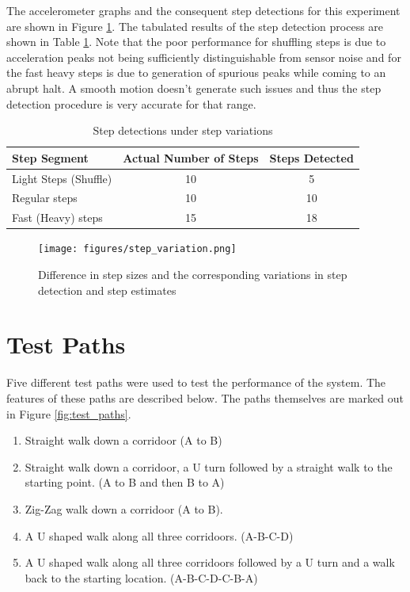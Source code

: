 The accelerometer graphs and the consequent step detections for this 
experiment are shown in Figure \ref{fig:step_variation}. The tabulated
results of the step detection process are shown in 
Table \ref{tbl:step_variation}. Note that the poor performance for 
shuffling steps is due to acceleration peaks not being sufficiently 
distinguishable from sensor noise and for the fast heavy steps is 
due to generation of spurious peaks while coming to an abrupt halt.
A smooth motion doesn't generate such issues and thus the step 
detection procedure is very accurate for that range.

\begin{table}[tbph]
    \centering
    \begin{tabular}{|l|c|c|}
        \hline
        \hline
        Step Segment & Actual Number of Steps & Steps Detected \\
        \hline
        Light Steps (Shuffle) & 10 & 5 \\
        Regular steps & 10 & 10 \\
        Fast (Heavy) steps & 15 & 18 \\
        \hline
        \hline
    \end{tabular}
    \caption{Step detections under step variations\label{tbl:step_variation}}
\end{table}

\begin{figure}
    \centering
    \texttt{[image: figures/step\_variation.png]}
    \caption{Difference in step sizes and the corresponding variations in 
        step detection and step estimates\label{fig:step_variation}}
\end{figure}

\section{Test Paths}

Five different test paths were used to test the performance of the system.
The features of these paths are described below. The paths themselves
are marked out in Figure \ref{fig:test_paths}.

\begin{enumerate}
\item Straight walk down a corridoor (A to B)
\item Straight walk down a corridoor, a U turn followed by a straight walk 
    to the starting point. (A to B and then B to A)
\item Zig-Zag walk down a corridoor (A to B).
\item A U shaped walk along all three corridoors. (A-B-C-D)
\item A U shaped walk along all three corridoors followed by a U turn and a 
    walk back to the starting location. (A-B-C-D-C-B-A)
\end{enumerate}

